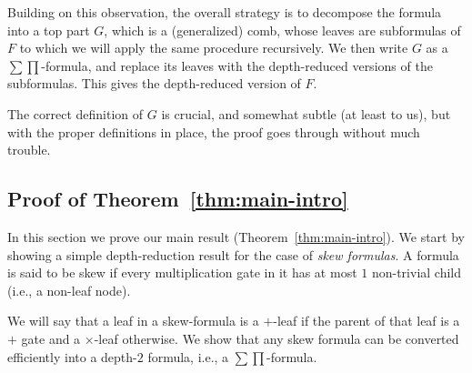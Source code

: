 \documentclass[11pt,a4paper]{article}
\begin{document}
Building on this observation, the overall strategy is to decompose the formula into a top part $G$, which is a (generalized) comb, whose leaves are subformulas of $F$ to which we will apply the same procedure recursively. We then write $G$ as a $\sum\prod$-formula, and replace its leaves with the depth-reduced versions of the subformulas. This gives the depth-reduced version of $F$.

The correct definition of $G$ is crucial, and somewhat subtle (at least to us), but with the proper definitions in place, the proof goes through without much trouble.

\subsection{Proof of Theorem~\ref{thm:main-intro}}

In this section we prove our main result (Theorem~\ref{thm:main-intro}). 
We start by showing a simple depth-reduction result for the case of \emph{skew formulas}. A formula is said to be skew if every multiplication gate in it has at most $1$ non-trivial child (i.e., a non-leaf node).




We will say that a leaf in a skew-formula is a $+$-leaf if the parent of that leaf is a $+$ gate and a $\times$-leaf otherwise. 
We show that any skew formula can be converted efficiently into a depth-$2$ formula, i.e., a $\sum\prod$-formula.
\end{document}
